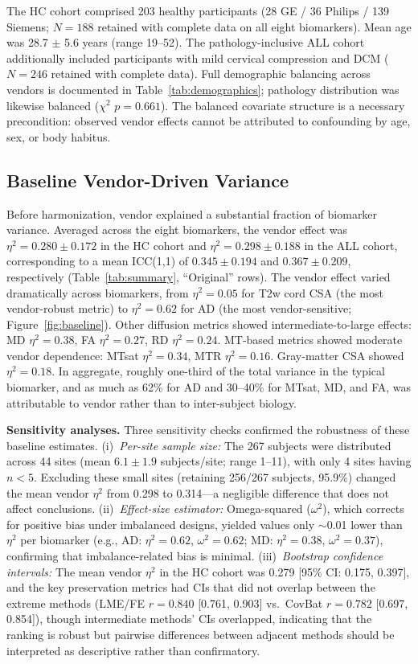 \documentclass[12pt,a4paper]{article}
\begin{document}
The HC cohort comprised 203 healthy participants (28 GE / 36 Philips / 139 Siemens; $N = 188$ retained with complete data on all eight biomarkers). Mean age was 28.7 $\pm$ 5.6 years (range 19--52). The pathology-inclusive ALL cohort additionally included participants with mild cervical compression and DCM ($N = 246$ retained with complete data). Full demographic balancing across vendors is documented in Table~\ref{tab:demographics}; pathology distribution was likewise balanced ($\chi^2$ $p = 0.661$). The balanced covariate structure is a necessary precondition: observed vendor effects cannot be attributed to confounding by age, sex, or body habitus.

\subsection{Baseline Vendor-Driven Variance}

Before harmonization, vendor explained a substantial fraction of biomarker variance. Averaged across the eight biomarkers, the vendor effect was $\eta^2 = 0.280 \pm 0.172$ in the HC cohort and $\eta^2 = 0.298 \pm 0.188$ in the ALL cohort, corresponding to a mean ICC(1,1) of $0.345 \pm 0.194$ and $0.367 \pm 0.209$, respectively (Table~\ref{tab:summary}, ``Original'' rows). The vendor effect varied dramatically across biomarkers, from $\eta^2 = 0.05$ for T2w cord CSA (the most vendor-robust metric) to $\eta^2 = 0.62$ for AD (the most vendor-sensitive; Figure~\ref{fig:baseline}). Other diffusion metrics showed intermediate-to-large effects: MD $\eta^2 = 0.38$, FA $\eta^2 = 0.27$, RD $\eta^2 = 0.24$. MT-based metrics showed moderate vendor dependence: MTsat $\eta^2 = 0.34$, MTR $\eta^2 = 0.16$. Gray-matter CSA showed $\eta^2 = 0.18$. In aggregate, roughly one-third of the total variance in the typical biomarker, and as much as 62\% for AD and 30--40\% for MTsat, MD, and FA, was attributable to vendor rather than to inter-subject biology.

\textbf{Sensitivity analyses.} Three sensitivity checks confirmed the robustness of these baseline estimates. (i)~\emph{Per-site sample size:} The 267 subjects were distributed across 44 sites (mean $6.1 \pm 1.9$ subjects/site; range 1--11), with only 4 sites having $n < 5$. Excluding these small sites (retaining 256/267 subjects, 95.9\%) changed the mean vendor $\eta^2$ from 0.298 to 0.314---a negligible difference that does not affect conclusions. (ii)~\emph{Effect-size estimator:} Omega-squared ($\omega^2$), which corrects for positive bias under imbalanced designs, yielded values only $\sim$0.01 lower than $\eta^2$ per biomarker (e.g., AD: $\eta^2 = 0.62$, $\omega^2 = 0.62$; MD: $\eta^2 = 0.38$, $\omega^2 = 0.37$), confirming that imbalance-related bias is minimal. (iii)~\emph{Bootstrap confidence intervals:} The mean vendor $\eta^2$ in the HC cohort was 0.279 [95\% CI: 0.175, 0.397], and the key preservation metrics had CIs that did not overlap between the extreme methods (LME/FE $r = 0.840$ [0.761, 0.903] vs.\ CovBat $r = 0.782$ [0.697, 0.854]), though intermediate methods' CIs overlapped, indicating that the ranking is robust but pairwise differences between adjacent methods should be interpreted as descriptive rather than confirmatory.
\end{document}
